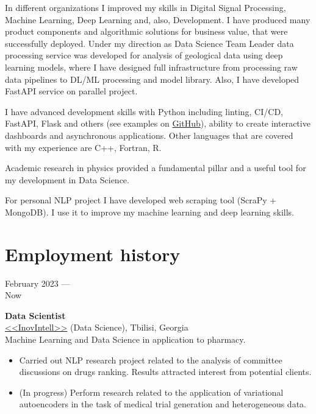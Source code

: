 \documentclass[10pt,a4paper]{article}
\newcommand{\lmpratio}{0.15}
\newcommand{\rmpratio}{0.74}
\newcommand{\verticalSpace}{0.3cm}
\newcommand{\vSpace}{0.5cm}
\newcommand{\horizontalSpace}{0.05\textwidth}
\newcommand{\sectionMain}[1]{\textbf{#1}}
\begin{document}
In different organizations I improved my skills in Digital Signal Processing, Machine Learning, Deep Learning and, also, Development. I have produced many product components and algorithmic solutions for business value, that were successfully deployed.
Under my direction as Data Science Team Leader data processing service was developed for analysis of geological data using deep learning models, where I have designed full infrastructure from processing raw data pipelines to DL/ML processing and model library.
Also, I have developed FastAPI service on parallel project. 


I have advanced development skills with Python including linting, CI/CD, FastAPI, Flask and others (see examples on \href{https://github.com/ArseniyShchepetnov}{GitHub}), ability to create interactive dashboards and asynchronous applications.
Other languages that are covered with my experience are C++, Fortran, R.

Academic research in physics provided a fundamental pillar and a useful tool for my development in Data Science.

For personal NLP project I have developed web scraping tool (ScraPy + MongoDB). I use it to improve my machine learning and deep learning skills.



\newpage


	\setlength{\parindent}{0em}
	\vspace{\verticalSpace}
	\section*{Employment history}

	\begin{minipage}[t]{\lmpratio\textwidth}
		February 2023 --- \\Now
	\end{minipage}
	\hspace{\horizontalSpace}
	\begin{minipage}[t]{\rmpratio\textwidth}
		\sectionMain{Data Scientist}\\
		\href{https://www.inovintell.com/}{<<InovIntell>>} (Data Science), Tbilisi, Georgia\\[0.1cm]	

Machine Learning and Data Science in application to pharmacy.

        \begin{itemize}
                \item 
Carried out NLP research project related to the analysis of committee discussions on drugs ranking. Results attracted interest from potential clients.
			\item 
(In progress) Perform research related to the application of variational autoencoders in the task of medical trial generation and heterogeneous data.
		\end{itemize}
    
	\end{minipage}	
	\vspace{\vSpace}
\end{document}
